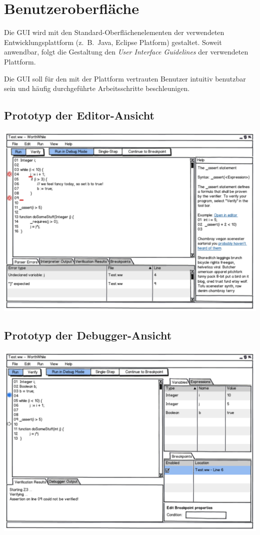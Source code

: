 \section{Benutzeroberfläche}%

Die GUI wird mit den Standard-Oberflächenelementen der verwendeten Entwicklungsplattform (z.~B.\ Java, Eclipse Platform) gestaltet. Soweit anwendbar, folgt die Gestaltung den \emph{User Interface Guidelines} der verwendeten Plattform.

Die GUI soll für den mit der Plattform vertrauten Benutzer intuitiv benutzbar sein und häufig durchgeführte Arbeitsschritte beschleunigen.

\subsection{Prototyp der Editor-Ansicht}%

\includegraphics[width=\textwidth]{mockup/editor.pdf}

\subsection{Prototyp der Debugger-Ansicht}%

\includegraphics[width=\textwidth]{mockup/debug.pdf}
